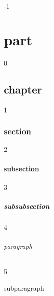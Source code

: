        -1	    \part{part} 
        0	    \chapter{chapter} 
        1	    \section{section} 
        2	    \subsection{subsection} 
        3	    \subsubsection{subsubsection}
        4	    \paragraph{paragraph}
        5	    \subparagraph{subparagraph} 
